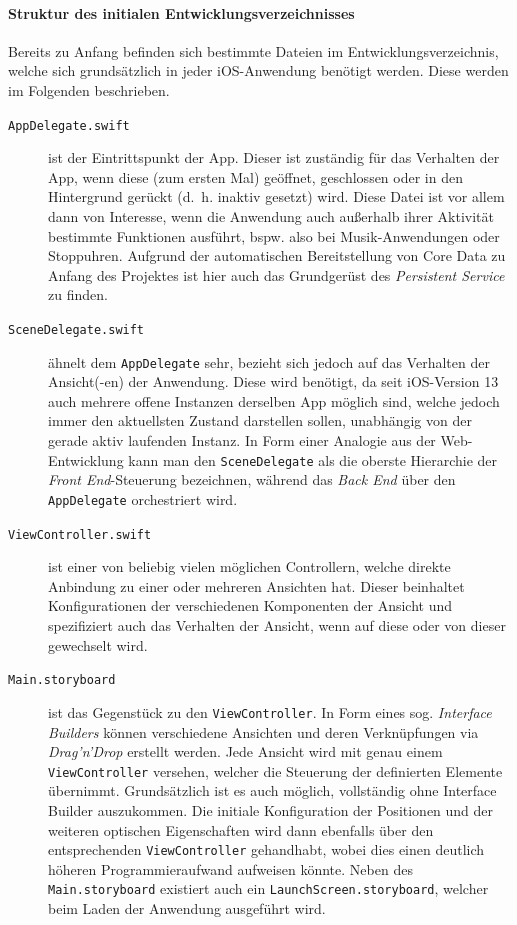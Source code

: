 \paragraph{Struktur des initialen Entwicklungsverzeichnisses}
Bereits zu Anfang befinden sich bestimmte Dateien im Entwicklungsverzeichnis, welche sich grundsätzlich in jeder iOS-Anwendung benötigt werden. Diese werden im Folgenden beschrieben.

\begin{description}
	\item[\texttt{AppDelegate.swift}] ist der Eintrittspunkt der App. Dieser ist zuständig für das Verhalten der App, wenn diese (zum ersten Mal) geöffnet, geschlossen oder in den Hintergrund gerückt (d.\ h. inaktiv gesetzt) wird. Diese Datei ist vor allem dann von Interesse, wenn die Anwendung auch außerhalb ihrer Aktivität bestimmte Funktionen ausführt, bspw. also bei Musik-Anwendungen oder Stoppuhren. Aufgrund der automatischen Bereitstellung von Core Data zu Anfang des Projektes ist hier auch das Grundgerüst des \textit{Persistent Service} zu finden.
	\item[\texttt{SceneDelegate.swift}] ähnelt dem \texttt{AppDelegate} sehr, bezieht sich jedoch auf das Verhalten der Ansicht(-en) der Anwendung. Diese wird benötigt, da seit iOS-Version 13 auch mehrere offene Instanzen derselben App möglich sind, welche jedoch immer den aktuellsten Zustand darstellen sollen, unabhängig von der gerade aktiv laufenden Instanz. In Form einer Analogie aus der Web-Entwicklung kann man den \texttt{SceneDelegate} als die oberste Hierarchie der \textit{Front End}-Steuerung bezeichnen, während das \textit{Back End} über den \texttt{AppDelegate} orchestriert wird.
	\item[\texttt{ViewController.swift}] ist einer von beliebig vielen möglichen Controllern, welche direkte Anbindung zu einer oder mehreren Ansichten hat. Dieser beinhaltet Konfigurationen der verschiedenen Komponenten der Ansicht und spezifiziert auch das Verhalten der Ansicht, wenn auf diese oder von dieser gewechselt wird.
	\item[\texttt{Main.storyboard}] ist das Gegenstück zu den \texttt{ViewController}. In Form eines sog. \textit{Interface Builders} können verschiedene Ansichten und deren Verknüpfungen via \textit{Drag'n'Drop} erstellt werden. Jede Ansicht wird mit genau einem \texttt{ViewController} versehen, welcher die Steuerung der definierten Elemente übernimmt. Grundsätzlich ist es auch möglich, vollständig ohne Interface Builder auszukommen. Die initiale Konfiguration der Positionen und der weiteren optischen Eigenschaften wird dann ebenfalls über den entsprechenden \texttt{ViewController} gehandhabt, wobei dies einen deutlich höheren Programmieraufwand aufweisen könnte. Neben des \texttt{Main.storyboard} existiert auch ein \texttt{LaunchScreen.storyboard}, welcher beim Laden der Anwendung ausgeführt wird.

\end{description}
